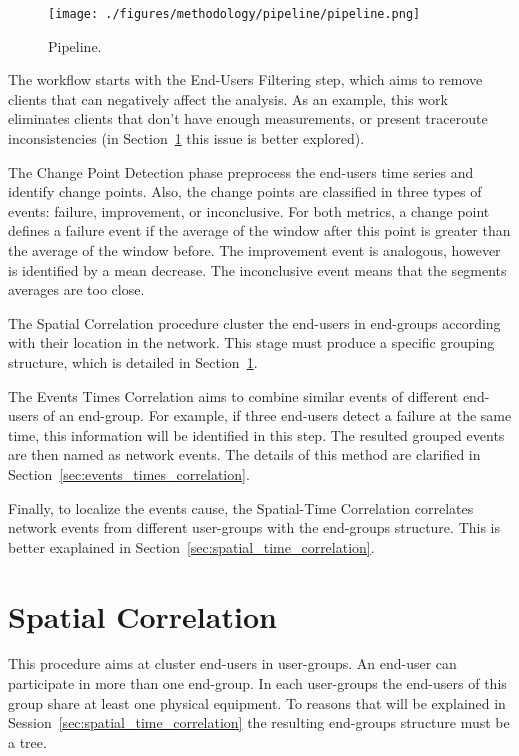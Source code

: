 \begin{figure}[H]
    \centering
    \texttt{[image: ./figures/methodology/pipeline/pipeline.png]}
    \caption{Pipeline.}
\label{fig:pipeline}
\end{figure}%

The workflow starts with the End-Users Filtering step,
which aims to remove clients that can negatively affect the analysis.
As an example, this work eliminates clients
that don't have enough measurements, or present
traceroute inconsistencies (in Section~\ref{sec:spatial_correlation}
this issue is better explored).

The Change Point Detection phase preprocess the end-users time series and
identify change points.
Also, the change points are classified in three types of events: failure,
improvement, or inconclusive. For both metrics, a change point defines a
failure event if the average of the window after this point is greater than the
average of the window before. The improvement event is analogous, however is
identified by a mean decrease.
The inconclusive event means that the segments averages are too close.

The Spatial Correlation procedure cluster the end-users in end-groups
according with their location in the network.
This stage must produce a specific grouping structure, which is detailed in
Section~\ref{sec:spatial_correlation}.

The Events Times Correlation aims to combine similar events of different
end-users of an end-group. For example, if three end-users detect a failure at
the same time, this information will be identified in this step. The resulted
grouped events are then named as network events.
The details of this method are clarified in
Section~\ref{sec:events_times_correlation}.

Finally, to localize the events cause, the Spatial-Time Correlation
correlates network events
from different user-groups with the end-groups structure.
This is better exaplained in Section~\ref{sec:spatial_time_correlation}.

\section{Spatial Correlation}
\label{sec:spatial_correlation}

This procedure aims at cluster end-users in user-groups.
An end-user can
participate in more than one end-group.
In each user-groups the end-users of this group share at least one physical
equipment.
To reasons that will be explained in
Session~\ref{sec:spatial_time_correlation} the resulting end-groups structure
must be a tree.

